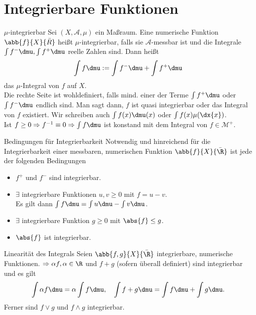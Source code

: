 \section*{Integrierbare Funktionen}

\begin{karte}{\( \mu \)-integrierbar}
	Sei \( (X, \mathcal{A}, \mu) \) ein Maßraum. Eine numerische Funktion 
	\( \abb{f}{X}{\bar{R}} \) heißt \(\mu\)-integrierbar, falls sie 
	\( \mathcal{A} \)-messbar ist und die Integrale \( \int f^- \dmu, \int f^+ \dmu \) 
	reelle Zahlen sind. Dann heißt 
	\[ \int f \dmu := \int f^- \dmu + \int f^+ \dmu \]
	das \( \mu \)-Integral von \( f \) auf \(X\).\\
	Die rechte Seite ist wohldefiniert, falls mind. einer der Terme \( \int f^+ \dmu \) oder 
	\( \int f^- \dmu \) endlich sind. Man sagt dann, \(f\) ist quasi integrierbar oder 
	das Integral von \(f\) existiert.
	Wir schreiben auch 
	\( \int f(x) \dmu(x) \) oder \( \int f(x) \mu(\dx{x}) \). \\
	Ist \( f \geq 0 \Rightarrow f^{-1} \equiv 0 \Rightarrow \int f \dmu\) ist konstand mit dem Integral von 
	\( f\in \mathcal{M}^+ \).
\end{karte}

\begin{karte}{Bedingungen für Integrierbarkeit}
	Notwendig und hinreichend für die Integrierbarkeit einer messbaren, numerischen Funktion 
	\( \abb{f}{X}{\bar{\R}} \) ist jede der folgenden Bedingungen 
	\begin{itemize}
		\item \( f^+ \) und \(f^-\) sind integrierbar.
		\item \(\exists\) integrierbare Funktionen \(u, v \geq 0\) mit \(f = u - v\).\\
		Es gilt dann \( \int f \dmu = \int u \dmu - \int v \dmu \).
		\item \( \exists \) integrierbare Funktion \( g\geq 0 \) mit \( \abs{f} \leq g \).
		\item \( \abs{f} \) ist integrierbar.
	\end{itemize}
\end{karte}

\begin{karte}{Linearität des Integrals}
	Seien \( \abb{f,g}{X}{\bar{\R}} \) integrierbare, numerische 
	Funktionen. \( \Rightarrow \alpha f, \alpha \in \R \) 
	und \( f + g \) (sofern überall definiert) sind integrierbar 
	und es gilt 
	\[ \int \alpha f \dmu = \alpha \int f \dmu, \quad
	\int f+g \dmu = \int f \dmu + \int g \dmu. \]
	Ferner sind \(f \vee g\) und \( f \wedge g \) integrierbar.
\end{karte}

